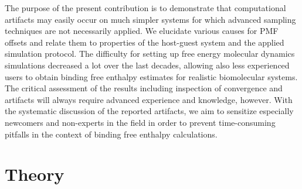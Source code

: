 \documentclass[9pt,lessons,pubversion]{livecoms}
\begin{document}
The purpose of the present contribution is to demonstrate that computational artifacts may easily occur on much simpler systems for which advanced sampling techniques are not necessarily applied.
We elucidate various causes for PMF offsets and relate them to properties of the host-guest system and the applied simulation protocol.
The difficulty for setting up free energy molecular dynamics simulations decreased a lot over the last decades, allowing also less experienced users to obtain binding free enthalpy estimates for realistic biomolecular systems.
The critical assessment of the results including inspection of convergence and artifacts will always require advanced experience and knowledge, however.
With the systematic discussion of the reported artifacts, we aim to sensitize especially newcomers and non-experts in the field in order to prevent time-consuming pitfalls in the context of binding free enthalpy calculations.

\section{Theory}
\label{sec:theory_DG0}
\end{document}
